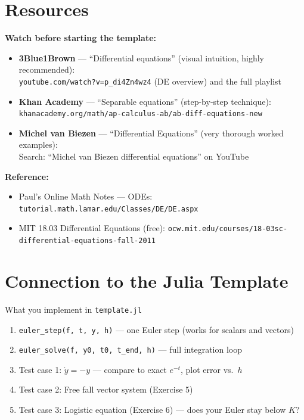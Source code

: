 \documentclass[12pt, a4paper]{article}
\begin{document}
\begin{solutionspace}[12cm]
\end{solutionspace}

\section{Resources}

\begin{hintbox}
\textbf{Watch before starting the template:}
\begin{itemize}
  \item \textbf{3Blue1Brown} — ``Differential equations'' (visual intuition, highly recommended):\\
        \texttt{youtube.com/watch?v=p\_di4Zn4wz4} (DE overview) and the full playlist
  \item \textbf{Khan Academy} — ``Separable equations'' (step-by-step technique):\\
        \texttt{khanacademy.org/math/ap-calculus-ab/ab-diff-equations-new}
  \item \textbf{Michel van Biezen} — ``Differential Equations'' (very thorough worked examples):\\
        Search: ``Michel van Biezen differential equations'' on YouTube
\end{itemize}
\textbf{Reference:}
\begin{itemize}
  \item Paul's Online Math Notes — ODEs: \texttt{tutorial.math.lamar.edu/Classes/DE/DE.aspx}
  \item MIT 18.03 Differential Equations (free): \texttt{ocw.mit.edu/courses/18-03sc-differential-equations-fall-2011}
\end{itemize}
\end{hintbox}

\section{Connection to the Julia Template}

\begin{theorybox}{What you implement in \texttt{template.jl}}
\begin{enumerate}
  \item \texttt{euler\_step(f, t, y, h)} — one Euler step (works for scalars and vectors)
  \item \texttt{euler\_solve(f, y0, t0, t\_end, h)} — full integration loop
  \item Test case 1: $\dot{y}=-y$ — compare to exact $e^{-t}$, plot error vs.\ $h$
  \item Test case 2: Free fall vector system (Exercise 5)
  \item Test case 3: Logistic equation (Exercise 6) — does your Euler stay below $K$?
\end{enumerate}
\end{theorybox}
\end{document}
